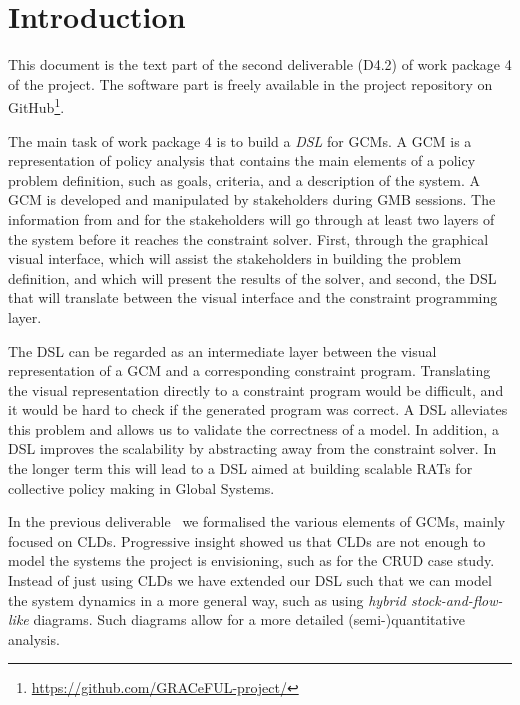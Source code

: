 \section{Introduction}\label{introduction}

This document is the text part of the second deliverable (D4.2) of
work package 4 of the \grace project.
%
The software part is freely available in the project repository on
GitHub\footnote{\url{https://github.com/GRACeFUL-project/}}.

The main task of work package 4 is to build a \emph{\ac{DSL}} for
\acp{GCM}.
%
A \ac{GCM} is a representation of policy analysis that contains the
main elements of a policy problem definition, such as goals, criteria,
and a description of the system.
%
A \ac{GCM} is developed and manipulated by stakeholders during
\ac{GMB} sessions.
%
The information from and for the stakeholders will go through at least
two layers of the \grace system before it reaches the constraint
solver.
%
First, through the graphical visual interface, which will assist the
stakeholders in building the problem definition, and which will
present the results of the solver, and second, the \ac{DSL} that
will translate between the visual interface and the constraint
programming layer.

The \ac{DSL} can be regarded as an intermediate layer between the
visual representation of a \acf{GCM} and a corresponding constraint
program.
%
Translating the visual representation directly to a constraint program
would be difficult, and it would be hard to check if the generated
program was correct.
%
A DSL alleviates this problem and allows us to validate the
correctness of a model.
%
In addition, a \ac{DSL} improves the scalability by abstracting away
from the constraint solver.
%
In the longer term this will lead to a \ac{DSL} aimed at building
scalable \acp{RAT} for collective policy making in Global Systems.


In the previous deliverable~\cite{D4.1} we formalised the various
elements of \acp{GCM}, mainly focused on \acp{CLD}.
%
Progressive insight showed us that \acp{CLD} are not enough to model
the systems the project is envisioning, such as for the \ac{CRUD} case
study.
%
Instead of just using \aclp{CLD} we have extended our \ac{DSL} such
that we can model the system dynamics in a more general way, such as
using \emph{hybrid stock-and-flow-like} diagrams.
%
Such diagrams allow for a more detailed (semi-)quantitative
analysis.

